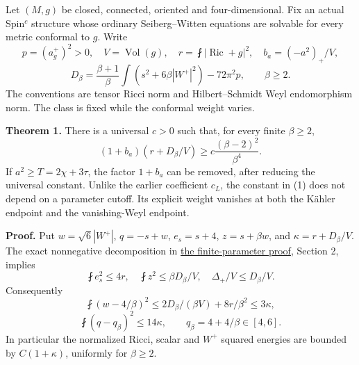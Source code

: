 \documentclass[
  10pt,
]{article}
\begin{document}
Let \((M,g)\) be closed, connected, oriented and four-dimensional. Fix
an actual Spin\(^c\) structure whose ordinary Seiberg--Witten equations
are solvable for every metric conformal to \(g\). Write \[
 p=(a_g^+)^2>0,\quad V=\operatorname{Vol}(g),\quad
 r=\fint|\operatorname{Ric}+g|^2,\quad b_a=(-a^2)_+/V,
\] \[
 D_\beta=\frac{\beta+1}{\beta}\int(s^2+6\beta|W^+|^2)
                 -72\pi^2p,\qquad \beta\ge2.
\] The conventions are tensor Ricci norm and Hilbert--Schmidt Weyl
endomorphism norm. The class is fixed while the conformal weight varies.

\textbf{Theorem 1.} There is a universal \(c>0\) such that, for every
finite \(\beta\ge2\), \[
 \boxed{(1+b_a)(r+D_\beta/V)
       \ge c\frac{(\beta-2)^2}{\beta^4}.}                 \tag{1}
\] If \(a^2\ge T=2\chi+3\tau\), the factor \(1+b_a\) can be removed,
after reducing the universal constant. Unlike the earlier coefficient
\(c_L\), the constant in (1) does not depend on a parameter cutoff. Its
explicit weight vanishes at both the Kähler endpoint and the
vanishing-Weyl endpoint.

\textbf{Proof.} Put \(w=\sqrt6|W^+|\), \(q=-s+w\), \(e_s=s+4\),
\(z=s+\beta w\), and \(\kappa=r+D_\beta/V\). The exact nonnegative
decomposition in \href{line1_functional_pencil.md}{the finite-parameter
proof}, Section 2, implies \[
 \fint e_s^2\le4r,\quad \fint z^2\le\beta D_\beta/V,
 \quad\Delta_+/V\le D_\beta/V.
\] Consequently \[
 \fint(w-4/\beta)^2
 \le2D_\beta/(\beta V)+8r/\beta^2\le3\kappa,
\] \[
 \fint(q-q_\beta)^2\le14\kappa,
 \qquad q_\beta=4+4/\beta\in[4,6].                       \tag{2}
\] In particular the normalized Ricci, scalar and \(W^+\) squared
energies are bounded by \(C(1+\kappa)\), uniformly for \(\beta\ge2\).
\end{document}
